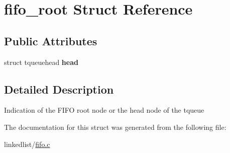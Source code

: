 \hypertarget{structfifo__root}{}\section{fifo\+\_\+root Struct Reference}
\label{structfifo__root}
\subsection*{Public Attributes}
\begin{DoxyCompactItemize}
\item 
\mbox{\label{structfifo__root_aa377ffaa3f82aee9f7a51ecb2c520f84}} 
struct tqueuehead {\bfseries head}
\end{DoxyCompactItemize}


\subsection{Detailed Description}
Indication of the F\+I\+FO root node or the head node of the tqueue 

The documentation for this struct was generated from the following file\+:\begin{DoxyCompactItemize}
\item 
linkedlist/\hyperlink{fifo_8c}{fifo.\+c}\end{DoxyCompactItemize}
